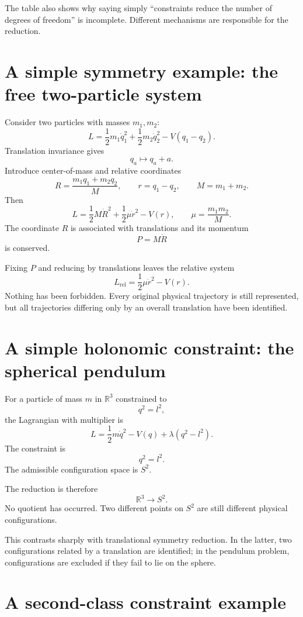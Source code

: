 The table also shows why saying simply ``constraints reduce the number of
degrees of freedom'' is incomplete.  Different mechanisms are responsible
for the reduction.

\section{A simple symmetry example: the free two-particle system}

Consider two particles with masses $m_1,m_2$:
\[
        L=
        \frac12m_1\dot q_1^2+
        \frac12m_2\dot q_2^2-
        V(q_1-q_2).
\]
Translation invariance gives
\[
        q_a\mapsto q_a+a.
\]
Introduce center-of-mass and relative coordinates
\[
        R=\frac{m_1q_1+m_2q_2}{M},
        \qquad
        r=q_1-q_2,
        \qquad
        M=m_1+m_2.
\]
Then
\[
        L=
        \frac12M\dot R^2+
        \frac12\mu\dot r^2-V(r),
        \qquad
        \mu=\frac{m_1m_2}{M}.
\]
The coordinate $R$ is associated with translations and its momentum
\[
        P=M\dot R
\]
is conserved.

Fixing $P$ and reducing by translations leaves the relative system
\[
        L_{\mathrm{rel}}
        =
        \frac12\mu\dot r^2-V(r).
\]
Nothing has been forbidden.  Every original physical trajectory is still
represented, but all trajectories differing only by an overall translation
have been identified.

\section{A simple holonomic constraint: the spherical pendulum}

For a particle of mass $m$ in $\mathbb{R}^3$ constrained to
\[
        q^2=l^2,
\]
the Lagrangian with multiplier is
\[
        L=
        \frac12m\dot q^2
        -V(q)
        +\lambda(q^2-l^2).
\]
The constraint is
\[
        q^2=l^2.
\]
The admissible configuration space is $S^2$.

The reduction is therefore
\[
        \mathbb{R}^3\longrightarrow S^2.
\]
No quotient has occurred.  Two different points on $S^2$ are still different
physical configurations.

This contrasts sharply with translational symmetry reduction.  In the latter,
two configurations related by a translation are identified; in the pendulum
problem, configurations are excluded if they fail to lie on the sphere.

\section{A second-class constraint example}

